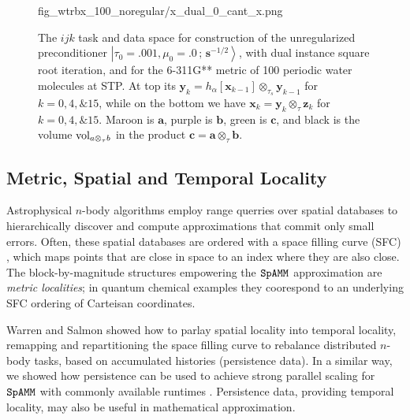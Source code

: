 \documentclass[letterpaper,twocolumn,amsmath,amsfont,amssymb,english,aps,jcp,preprintnumbers,groupaddress,nofootinbib,tightenlines,floatfix]{revtex4}
\newcommand{\mat}[1]{\boldsymbol{#1}}
\newcommand{\ot}{  {\scriptstyle \otimes}_{ \tau } }
\newcommand{\ots}{ {\scriptstyle \otimes}_{ \! \tau_s } }
\theoremstyle{plain}
\theoremstyle{remark}
\theoremstyle{plain}
\begin{document}
\begin{figure}[h]
{                        {fig_wtrbx_100_noregular/x_dual_0_cant_x.png}} 
\caption{
The $ijk$ task and data space for construction of the unregularized preconditioner 
$\left|\tau_0=.001,\mu_0=.0\, ; \,\scriptstyle{\mat{s}^{-1/2}} \right>$, with
dual instance square root iteration, and for the 6-311G** metric of 100 periodic water molecules
at STP.  At top its  $\mat{y}_k=h_\alpha[ \mat{x}_{k-1} ] \ots \mat{y}_{k-1}$
for $k=0,4,\& 15$, while on the bottom we have $\mat{x}_k=  \mat{y}_{k}  \ot \mat{z}_{k}$ for $k=0,4, \& 15$.
Maroon is $\mat{a}$, purple is $\mat{b}$, green is $\mat{c}$,  and black is the volume ${\rm vol}_{a \ot b}$
in the product $\mat{c}=\mat{a} \ot \mat{b}$.}\label{Lensing3}
\end{figure}

\subsection{Metric, Spatial and Temporal Locality}

Astrophysical $n$-body algorithms employ range querries over spatial databases to hierarchically discover 
and compute approximations that commit only small errors.  Often, these spatial databases are ordered with a 
space filling curve (SFC) \cite{}, which maps points that are close in space to an index where they are also close. 
The block-by-magnitude structures empowering the $\tt SpAMM$ approximation are {\em metric localities}; 
in quantum chemical examples they coorespond to an underlying SFC ordering of Carteisan coordinates. 

Warren and Salmon showed how to parlay spatial locality into temporal locality, 
remapping and repartitioning the space filling curve to rebalance distributed $n$-body tasks,
based on accumulated histories (persistence data).
In a similar way, we showed how persistence can be used to achieve 
strong parallel scaling for $\tt SpAMM$ with commonly available runtimes \cite{}.  
Persistence data, providing temporal locality, may also be useful in mathematical approximation.  
\end{document}

